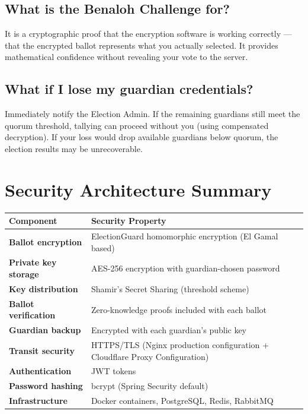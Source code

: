 \documentclass[12pt,a4paper,openany]{book}
\begin{document}
\section*{What is the Benaloh Challenge for?}
It is a cryptographic proof that the encryption software is working correctly --- that the encrypted ballot represents what you actually selected. It provides mathematical confidence without revealing your vote to the server.

\section*{What if I lose my guardian credentials?}
Immediately notify the Election Admin. If the remaining guardians still meet the quorum threshold, tallying can proceed without you (using compensated decryption). If your loss would drop available guardians below quorum, the election results may be unrecoverable.

\chapter{Security Architecture Summary}

\begin{center}
	\begin{tabularx}{0.95\textwidth}{>{\bfseries}l X}
		\toprule
		\rowcolor{primaryblue}\color{white}Component & \color{white}Security Property                                              \\
		\midrule
		\rowcolor{lightgray}Ballot encryption        & ElectionGuard homomorphic encryption (El Gamal based)                       \\
		Private key storage                          & AES-256 encryption with guardian-chosen password                            \\
		\rowcolor{lightgray}Key distribution         & Shamir's Secret Sharing (threshold scheme)                                  \\
		Ballot verification                          & Zero-knowledge proofs included with each ballot                             \\
		\rowcolor{lightgray}Guardian backup          & Encrypted with each guardian's public key                                   \\
		Transit security                             & HTTPS/TLS (Nginx production configuration + Cloudflare Proxy Configuration) \\
		\rowcolor{lightgray}Authentication           & JWT tokens                                                             \\
		Password hashing                             & bcrypt (Spring Security default)                                            \\
		\rowcolor{lightgray}Infrastructure           & Docker containers, PostgreSQL, Redis, RabbitMQ                              \\
		\bottomrule
	\end{tabularx}
\end{center}
\end{document}

